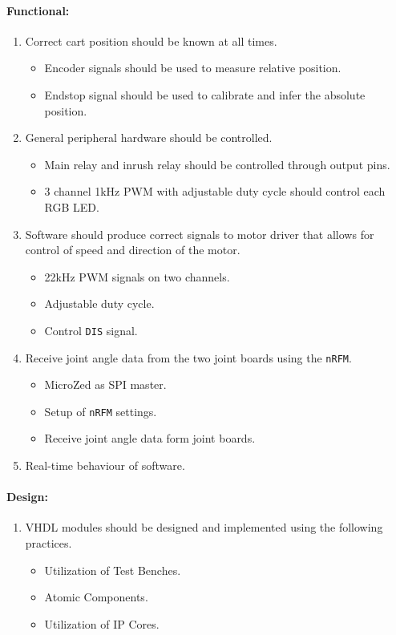 \paragraph{Functional:}
\begin{enumerate}[resume]
	\item Correct cart position should be known at all times.
	\label{enum:correct_cart_position}
	\begin{itemize}
		\item Encoder signals should be used to measure relative position.
		\item Endstop signal should be used to calibrate and infer the absolute position.
	\end{itemize}
	\item General peripheral hardware should be controlled.
	\label{enum:general_peripheral_hardware}
	\begin{itemize}
		\item Main relay and inrush relay should be controlled through output pins.
		\item 3 channel 1kHz PWM with adjustable duty cycle should control each RGB LED.
	\end{itemize}
	\item Software should produce correct signals to motor driver that allows for control of speed and direction of the motor.
	\label{enum:software_correct_motor_driver_signals}
	\begin{itemize}
		\item 22kHz PWM signals on two channels.
		\item Adjustable duty cycle.
		\item Control \texttt{DIS} signal.
 	\end{itemize}
	\item Receive joint angle data from the two joint boards using the \texttt{nRFM}.
	\label{enum:receive_joint_angle}
	\begin{itemize}
		\item MicroZed as SPI master.
		\item Setup of \texttt{nRFM} settings.
		\item Receive joint angle data form joint boards.
	\end{itemize}
	\item Real-time behaviour of software.
	\label{enum:real_time_behavior}
\end{enumerate}

\paragraph{Design:}
\begin{enumerate}[resume]
	\item VHDL modules should be designed and implemented using the following practices.
	\label{enum:vhdl_implementation_practices}
	\begin{itemize}
		\item Utilization of Test Benches.
		\item Atomic Components.
		\item Utilization of IP Cores.
	\end{itemize}
\end{enumerate}
